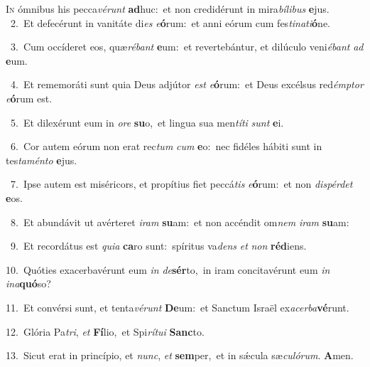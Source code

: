 \lettrine{\initial\textcolor{\initialcolor}{I}}{n} ómnibus his pecca\-\textit{vé}\-\textit{runt} \textbf{ad}\-huc:~\star et non credidérunt in mira\-\textit{bí}\-\textit{li}\textit{bus} \textbf{e}\-jus.\\
{\numbfont\textcolor{\numbcolor}{~2.}}~Et defecérunt in vanitáte di\textit{es} \textit{e}\-\textbf{ó}rum:~\star et anni eórum cum fes\-\textit{ti}\-\textit{na}\textit{ti}\textbf{ó}ne.\par
{\numbfont\textcolor{\numbcolor}{~3.}}~Cum occíderet eos, quæ\-\textit{ré}\-\textit{bant} \textbf{e}\-um:~\star et revertebántur, et dilúculo veni\-\textit{é}\-\textit{bant} \textit{ad} \textbf{e}\-um.\par
{\numbfont\textcolor{\numbcolor}{~4.}}~Et rememoráti sunt quia Deus adjútor \textit{est} \textit{e}\-\textbf{ó}rum:~\star et Deus excélsus red\-\textit{émp}\-\textit{tor} \textit{e}\-\textbf{ó}rum est.\par
{\numbfont\textcolor{\numbcolor}{~5.}}~Et dilexérunt eum in \textit{o}\-\textit{re} \textbf{su}\-o,~\star et lingua sua men\-\textit{tí}\-\textit{ti} \textit{sunt} \textbf{e}\-i.\par
{\numbfont\textcolor{\numbcolor}{~6.}}~Cor autem eórum non erat rec\textit{tum} \textit{cum} \textbf{e}\-o:~\star nec fidéles hábiti sunt in tes\-\textit{ta}\-\textit{mén}\textit{to} \textbf{e}\-jus.\par
{\numbfont\textcolor{\numbcolor}{~7.}}~Ipse autem est miséricors, et propítius fiet peccá\textit{tis} \textit{e}\-\textbf{ó}rum:~\star et non \textit{dis}\-\textit{pér}\textit{det} \textbf{e}\-os.\par
{\numbfont\textcolor{\numbcolor}{~8.}}~Et abundávit ut avérteret \textit{i}\-\textit{ram} \textbf{su}\-am:~\star et non accéndit om\textit{nem} \textit{i}\-\textit{ram} \textbf{su}\-am:\par
{\numbfont\textcolor{\numbcolor}{~9.}}~Et recordátus est \textit{qui}\-\textit{a} \textbf{ca}\-ro sunt:~\star spíritus va\textit{dens} \textit{et} \textit{non} \textbf{réd}\-iens.\par
{\numbfont\textcolor{\numbcolor}{10.}}~Quóties exacerbavérunt eum \textit{in} \textit{de}\-\textbf{sér}to,~\star in iram concitavérunt eum \textit{in} \textit{in}\-\textit{a}\textbf{quó}so?\par
{\numbfont\textcolor{\numbcolor}{11.}}~Et convérsi sunt, et tenta\-\textit{vé}\-\textit{runt} \textbf{De}\-um:~\star et Sanctum Israël ex\-\textit{a}\-\textit{cer}\textit{ba}\textbf{vé}runt.\par
{\numbfont\textcolor{\numbcolor}{12.}}~Glória Pa\-\textit{tri}\-, \textit{et} \textbf{Fí}\-lio,~\star et Spi\-\textit{rí}\-\textit{tu}\textit{i} \textbf{Sanc}\-to.\par
{\numbfont\textcolor{\numbcolor}{13.}}~Sicut erat in princípio, et \textit{nunc}\-, \textit{et} \textbf{sem}\-per,~\star et in sǽcula sæ\-\textit{cu}\-\textit{ló}\textit{rum}. \textbf{A}\-men.\par
